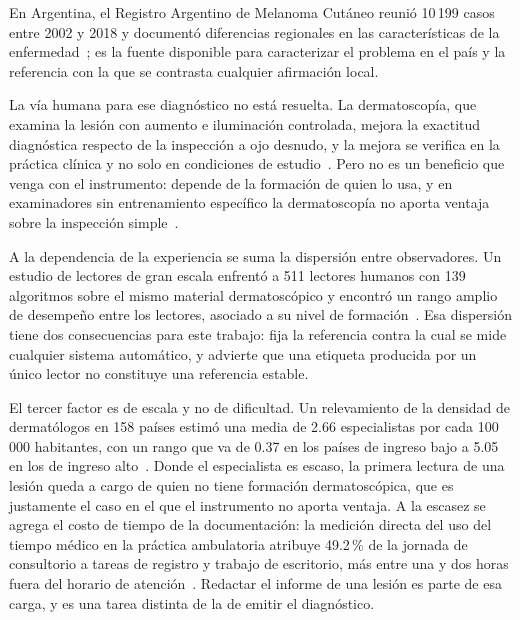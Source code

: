 En Argentina, el Registro Argentino de Melanoma Cutáneo reunió 10\,199 casos entre 2002 y 2018 y documentó
diferencias regionales en las características de la enfermedad~\cite{loria2020cutaneous}; es la fuente
disponible para caracterizar el problema en el país y la referencia con la que se contrasta cualquier
afirmación local.

La vía humana para ese diagnóstico no está resuelta. La dermatoscopía, que examina la lesión con aumento e
iluminación controlada, mejora la exactitud diagnóstica respecto de la inspección a ojo desnudo, y la mejora
se verifica en la práctica clínica y no solo en condiciones de estudio~\cite{vestergaard2008dermoscopy}. Pero
no es un beneficio que venga con el instrumento: depende de la formación de quien lo usa, y en examinadores
sin entrenamiento específico la dermatoscopía no aporta ventaja sobre la inspección
simple~\cite{kittler2002diagnostic}.

A la dependencia de la experiencia se suma la dispersión entre observadores. Un estudio de lectores de gran
escala enfrentó a 511 lectores humanos con 139 algoritmos sobre el mismo material dermatoscópico y encontró
un rango amplio de desempeño entre los lectores, asociado a su nivel de
formación~\cite{tschandl2019comparison}. Esa dispersión tiene dos consecuencias para este trabajo: fija la
referencia contra la cual se mide cualquier sistema automático, y advierte que una etiqueta producida por un
único lector no constituye una referencia estable.

El tercer factor es de escala y no de dificultad. Un relevamiento de la densidad de dermatólogos en 158
países estimó una media de 2.66 especialistas por cada 100\,000 habitantes, con un rango que va de 0.37 en
los países de ingreso bajo a 5.05 en los de ingreso alto~\cite{freeman2026global}. Donde el especialista es
escaso, la primera lectura de una lesión queda a cargo de quien no tiene formación dermatoscópica, que es
justamente el caso en el que el instrumento no aporta ventaja. A la escasez se agrega el costo de tiempo de
la documentación: la medición directa del uso del tiempo médico en la práctica ambulatoria atribuye
49.2\,\% de la jornada de consultorio a tareas de registro y trabajo de escritorio, más entre una y dos horas
fuera del horario de atención~\cite{sinsky2016allocation}. Redactar el informe de una lesión es parte de esa
carga, y es una tarea distinta de la de emitir el diagnóstico.

